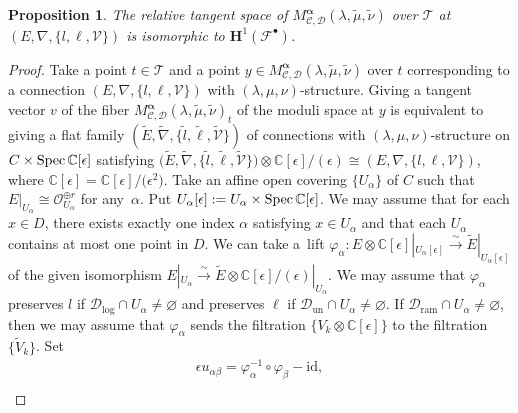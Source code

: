 \documentclass[pdftex]{sigma}
\numberwithin{equation}{section}
\newtheorem{Proposition}[Theorem]{Proposition}
\newcommand\Spec{\mathop{\rm Spec}\nolimits}
\newcommand{\balpha}{\boldsymbol \alpha}
\begin{document}
\begin{Proposition} \label{prop: tangent space of the moduli space}
The relative tangent space
of $M^{\balpha}_{{\mathcal C},{\mathcal D}}(\lambda,\tilde{\mu},\tilde{\nu})$
over ${\mathcal T}$ at
$(E,\nabla,\{ l,\ell,{\mathcal V}\})$
is isomorphic to $\mathbf{H}^1({\mathcal F}^{\bullet})$.
\end{Proposition}

\begin{proof}
Take a point $t\in{\mathcal T}$ and
a point $y\in M^{\balpha}_{{\mathcal C},{\mathcal D}}(\lambda,\tilde{\mu},\tilde{\nu})$
over $t$
corresponding to a connection
$(E,\nabla,\{ l,\ell,{\mathcal V}\})$
with $(\lambda,\mu,\nu)$-structure.
Giving a tangent vector $v$ of the fiber
$M^{\balpha}_{{\mathcal C},{\mathcal D}}(\lambda,\tilde{\mu},\tilde{\nu})_t$
of the moduli space at $y$
is equivalent to giving
a flat family
$(\tilde{E},\tilde{\nabla},\{\tilde{l},\tilde{\ell},\tilde{\mathcal V}\})$
of connections with $(\lambda,\mu,\nu)$-structure
on $C\times\Spec\mathbb{C}[\epsilon]$
satisfying
$\big(\tilde{E},\tilde{\nabla},\big\{\tilde{l},\tilde{\ell},\tilde{\mathcal V}\big\}\big)
\otimes\mathbb{C}[\epsilon]/(\epsilon)
\cong (E,\nabla,\{ l,\ell,{\mathcal V}\})$,
where $\mathbb{C}[\epsilon]=\mathbb{C}[\epsilon]/\big(\epsilon^2\big)$.
Take an affine open covering
$\{U_{\alpha}\}$ of $C$
such that $E|_{U_{\alpha}}\cong{\mathcal O}_{U_{\alpha}}^{\oplus r}$ for any~$\alpha$.
Put $U_{\alpha}[\epsilon]:=U_{\alpha}\times\Spec\mathbb{C}[\epsilon]$.
We may assume that for each $x\in D$,
there exists exactly one index $\alpha$ satisfying
$x\in U_{\alpha}$ and that
each $U_{\alpha}$ contains at most one point in $D$.
We can take a~lift
$\varphi_{\alpha}\colon
E\otimes\mathbb{C}[\epsilon]|_{U_{\alpha}[\epsilon]} \stackrel{\sim}\longrightarrow
\tilde{E}|_{U_{\alpha}[\epsilon]}$
of the given isomorphism
$E|_{U_{\alpha}}\stackrel{\sim}\longrightarrow
\tilde{E}\otimes\mathbb{C}[\epsilon]/(\epsilon)|_{U_{\alpha}}$.
We may assume that $\varphi_{\alpha}$ preserves $l$
if ${\mathcal D}_{\mathrm{log}}\cap U_{\alpha}\neq\varnothing$
and preserves $\ell$
if ${\mathcal D}_{\mathrm{un}}\cap U_{\alpha}\neq\varnothing$.
If ${\mathcal D}_{\mathrm{ram}}\cap U_{\alpha}\neq \varnothing$,
then we may assume that
$\varphi_{\alpha}$ sends the filtration $\big\{V_k\otimes\mathbb{C}[\epsilon]\big\}$
to the filtration $\{\tilde{V}_k\}$.
Set
\begin{gather*}
 \epsilon u_{\alpha\beta}= \varphi_{\alpha}^{-1}\circ\varphi_{\beta}-\mathrm{id}, \\

\end{gather*}
\end{proof}
\end{document}
